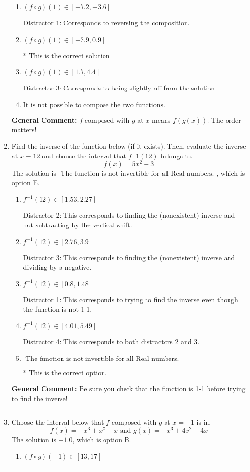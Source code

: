 \documentclass{extbook}[14pt]
\newcommand{\litem}[1]{\item #1

\rule{\textwidth}{0.4pt}}
\begin{document}
\begin{enumerate}
{\begin{enumerate}[label=\Alph*.]
 Distractor 2: Corresponds to being slightly off from the solution.
\item \( (f \circ g)(1) \in [-7.2, -3.6] \)

 Distractor 1: Corresponds to reversing the composition.
\item \( (f \circ g)(1) \in [-3.9, 0.9] \)

* This is the correct solution
\item \( (f \circ g)(1) \in [1.7, 4.4] \)

 Distractor 3: Corresponds to being slightly off from the solution.
\item \( \text{It is not possible to compose the two functions.} \)


\end{enumerate}

\textbf{General Comment:} $f$ composed with $g$ at $x$ means $f(g(x))$. The order matters!
}
\litem{
Find the inverse of the function below (if it exists). Then, evaluate the inverse at $x = 12$ and choose the interval that $f^-1(12)$ belongs to.
\[ f(x) = 5 x^2 + 3 \]The solution is \( \text{ The function is not invertible for all Real numbers. } \), which is option E.\begin{enumerate}[label=\Alph*.]
\item \( f^{-1}(12) \in [1.53, 2.27] \)

 Distractor 2: This corresponds to finding the (nonexistent) inverse and not subtracting by the vertical shift.
\item \( f^{-1}(12) \in [2.76, 3.9] \)

 Distractor 3: This corresponds to finding the (nonexistent) inverse and dividing by a negative.
\item \( f^{-1}(12) \in [0.8, 1.48] \)

 Distractor 1: This corresponds to trying to find the inverse even though the function is not 1-1. 
\item \( f^{-1}(12) \in [4.01, 5.49] \)

 Distractor 4: This corresponds to both distractors 2 and 3.
\item \( \text{ The function is not invertible for all Real numbers. } \)

* This is the correct option.
\end{enumerate}

\textbf{General Comment:} Be sure you check that the function is 1-1 before trying to find the inverse!
}
\litem{
Choose the interval below that $f$ composed with $g$ at $x=-1$ is in.
\[ f(x) = -x^{3} + x^{2} -x \text{ and } g(x) = -x^{3} +4 x^{2} +4 x \]The solution is \( -1.0 \), which is option B.\begin{enumerate}[label=\Alph*.]
\item \( (f \circ g)(-1) \in [13, 17] \)


\end{enumerate}}
\end{enumerate}
\end{document}
